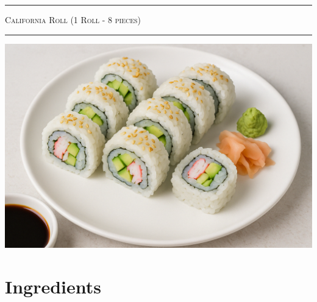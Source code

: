 \documentclass[landscape, a4paper]{article}
\begin{document}
\noindent
\centering
\footnotesize
\begin{minipage}[t]{0.31\textwidth}
	\vspace{0.5cm}
	\setlength{\parskip}{0.25cm}

	\textcolor{PrimaryColor}{
		\rule{\linewidth}{0.5mm}
		\vspace{-0.1cm}
		\begin{center}
			\large
			\textsc{California Roll (1 Roll - 8 pieces)}
		\end{center}
		\rule{\linewidth}{0.5mm}
	}

	\includegraphics[width=\linewidth]{./figures/california_rolls.png}

	\section*{Ingredients}


\end{minipage}
\end{document}
